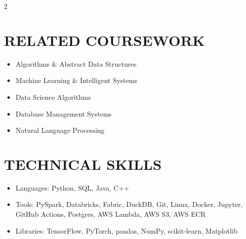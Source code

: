 \documentclass[11pt, a4paper, roman]{moderncv}
\begin{document}
\begin{multicols}{2}
\section{RELATED COURSEWORK}
{\begin{itemize}
    \item Algorithms \& Abstract Data Structures
    \item Machine Learning \& Intelligent Systems
    \item Data Science Algorithms
    \item Database Management Systems
    \item Natural Language Processing
  \end{itemize}
}

\columnbreak

\section{TECHNICAL SKILLS}
{\begin{itemize}
    \item Languages: Python, SQL, Java, C++
    \item Tools: PySpark, Databricks, Fabric, DuckDB, Git, Linux, Docker, Jupyter, GitHub Actions, Postgres, AWS Lambda, AWS S3, AWS ECR
    \item Libraries: TensorFlow, PyTorch, pandas, NumPy, scikit-learn, Matplotlib
  \end{itemize}
}
\end{multicols}
\end{document}
